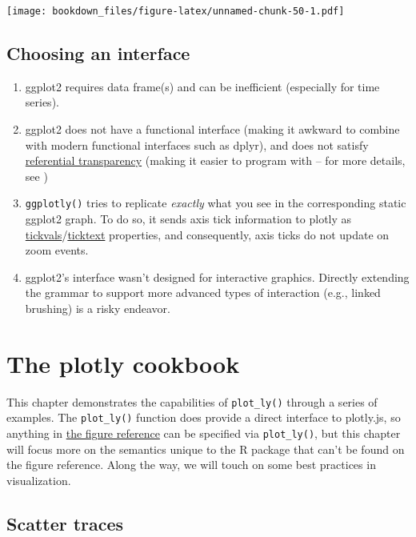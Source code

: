 \documentclass[12pt,]{isuthesis}
\providecommand{\tightlist}{%
  \setlength{\itemsep}{0pt}\setlength{\parskip}{0pt}}
\begin{document}
\texttt{[image: bookdown\_files/figure-latex/unnamed-chunk-50-1.pdf]}

\subsection{Choosing an interface}\label{choosing-an-interface}

\begin{enumerate}
\def\labelenumi{\arabic{enumi}.}
\tightlist
\item
  ggplot2 requires data frame(s) and can be inefficient (especially for
  time series).
\item
  ggplot2 does not have a functional interface (making it awkward to
  combine with modern functional interfaces such as dplyr), and does not
  satisfy
  \href{https://en.wikipedia.org/wiki/Referential_transparency}{referential
  transparency} (making it easier to program with -- for more details,
  see )
\item
  \texttt{ggplotly()} tries to replicate \emph{exactly} what you see in
  the corresponding static ggplot2 graph. To do so, it sends axis tick
  information to plotly as
  \href{https://plot.ly/r/reference/\#layout-xaxis-tickvals}{tickvals}/\href{https://plot.ly/r/reference/\#layout-xaxis-ticktext}{ticktext}
  properties, and consequently, axis ticks do not update on zoom events.
\item
  ggplot2's interface wasn't designed for interactive graphics. Directly
  extending the grammar to support more advanced types of interaction
  (e.g., linked brushing) is a risky endeavor.
\end{enumerate}

\section{The plotly cookbook}\label{the-plotly-cookbook}

This chapter demonstrates the capabilities of \texttt{plot\_ly()}
through a series of examples. The \texttt{plot\_ly()} function does
provide a direct interface to plotly.js, so anything in
\href{https://plot.ly/r/reference/}{the figure reference} can be
specified via \texttt{plot\_ly()}, but this chapter will focus more on
the semantics unique to the R package that can't be found on the figure
reference. Along the way, we will touch on some best practices in
visualization.

\hypertarget{scatter-traces}{\subsection{Scatter
traces}\label{scatter-traces}}
\end{document}
